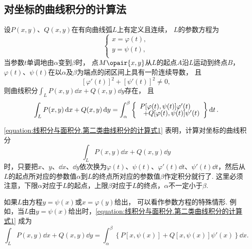 \subsection{对坐标的曲线积分的计算法}
\begin{theorem}
设\(P(x,y)\)、\(Q(x,y)\)在有向曲线弧\(L\)上有定义且连续，
\(L\)的参数方程为\[
\left\{ \begin{array}{l}
x = \varphi(t), \\
y = \psi(t), \\
\end{array} \right.
\]当参数\(t\)单调地由\(\alpha\)变到\(\beta\)时，
点\(M\opair{x,y}\)从\(L\)的起点\(A\)沿\(L\)运动到终点\(B\)，
\(\varphi(t)\)、\(\psi(t)\)在以\(\alpha\)及\(\beta\)为端点的闭区间上具有一阶连续导数，
且\[
[\varphi'(t)]^2+[\psi'(t)]^2 \neq 0,
\]则曲线积分\(\int_L{P(x,y)\dd{x} + Q(x,y)\dd{y}}\)存在，
且\begin{equation}\label{equation:线积分与面积分.第二类曲线积分的计算式1}
\int_L P(x,y) \dd{x} + Q(x,y) \dd{y}
= \int_{\alpha}^{\beta} \left\{ \def\arraystretch{.7}\begin{array}{l}
P[\varphi(t),\psi(t)] \varphi'(t) \\
\hspace{5pt}+ Q[\varphi(t),\psi(t)] \psi'(t)
\end{array} \right\} \dd{t}.
\end{equation}
\end{theorem}
\cref{equation:线积分与面积分.第二类曲线积分的计算式1} 表明，计算对坐标的曲线积分\[
\int_L P(x,y) \dd{x} + Q(x,y) \dd{y}
\]时，只要把\(x\)、\(y\)、\(\dd{x}\)、\(\dd{y}\)依次换为\(\varphi(t)\)、\(\psi(t)\)、\(\varphi'(t) \dd{t}\)、\(\psi'(t) \dd{t}\)，然后从\(L\)的起点所对应的参数值\(\alpha\)到\(L\)的终点所对应的参数值\(\beta\)作定积分就行了.
这里必须注意，下限\(\alpha\)对应于\(L\)的起点，上限\(\beta\)对应于\(L\)的终点，\(\alpha\)不一定小于\(\beta\).

如果\(L\)由方程\(y = \psi(x)\)或\(x = \varphi(y)\)给出，
可以看作参数方程的特殊情形.
例如，当\(L\)由\(y = \psi(x)\)给出时，\cref{equation:线积分与面积分.第二类曲线积分的计算式1} 成为\[
\int_L P(x,y) \dd{x} + Q(x,y) \dd{y}
= \int_{\alpha}^{\beta} \left\{
	P[x,\psi(x)] + Q[x,\psi(x)] \psi'(x)
\right\} \dd{x}.
\]

